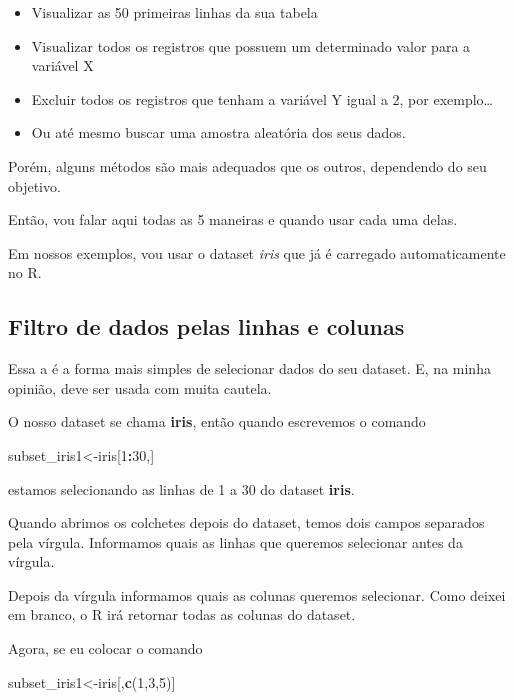 \documentclass[
]{book}
\newenvironment{Shaded}{\begin{snugshade}}{\end{snugshade}}
\newcommand{\DecValTok}[1]{\textcolor[rgb]{0.00,0.00,0.81}{#1}}
\newcommand{\KeywordTok}[1]{\textcolor[rgb]{0.13,0.29,0.53}{\textbf{#1}}}
\newcommand{\NormalTok}[1]{#1}
\newcommand{\OperatorTok}[1]{\textcolor[rgb]{0.81,0.36,0.00}{\textbf{#1}}}
\providecommand{\tightlist}{%
  \setlength{\itemsep}{0pt}\setlength{\parskip}{0pt}}
\begin{document}
\begin{itemize}
\tightlist
\item
  Visualizar as 50 primeiras linhas da sua tabela
\item
  Visualizar todos os registros que possuem um determinado valor para a
  variável X
\item
  Excluir todos os registros que tenham a variável Y igual a 2, por
  exemplo\ldots{}
\item
  Ou até mesmo buscar uma amostra aleatória dos seus dados.
\end{itemize}

Porém, alguns métodos são mais adequados que os outros, dependendo do
seu objetivo.

Então, vou falar aqui todas as 5 maneiras e quando usar cada uma delas.

Em nossos exemplos, vou usar o dataset \emph{iris} que já é carregado
automaticamente no R.

\hypertarget{filtro-de-dados-pelas-linhas-e-colunas}{%
\subsection{Filtro de dados pelas linhas e
colunas}\label{filtro-de-dados-pelas-linhas-e-colunas}}

Essa a é a forma mais simples de selecionar dados do seu dataset. E, na
minha opinião, deve ser usada com muita cautela.

O nosso dataset se chama \textbf{iris}, então quando escrevemos o
comando

\begin{Shaded}
\begin{Highlighting}[]
\NormalTok{subset_iris1<-iris[}\DecValTok{1}\OperatorTok{:}\DecValTok{30}\NormalTok{,]}
\end{Highlighting}
\end{Shaded}

estamos selecionando as linhas de 1 a 30 do dataset \textbf{iris}.

Quando abrimos os colchetes depois do dataset, temos dois campos
separados pela vírgula. Informamos quais as linhas que queremos
selecionar antes da vírgula.

Depois da vírgula informamos quais as colunas queremos selecionar. Como
deixei em branco, o R irá retornar todas as colunas do dataset.

Agora, se eu colocar o comando

\begin{Shaded}
\begin{Highlighting}[]
\NormalTok{subset_iris1<-iris[,}\KeywordTok{c}\NormalTok{(}\DecValTok{1}\NormalTok{,}\DecValTok{3}\NormalTok{,}\DecValTok{5}\NormalTok{)]}
\end{Highlighting}
\end{Shaded}
\end{document}
